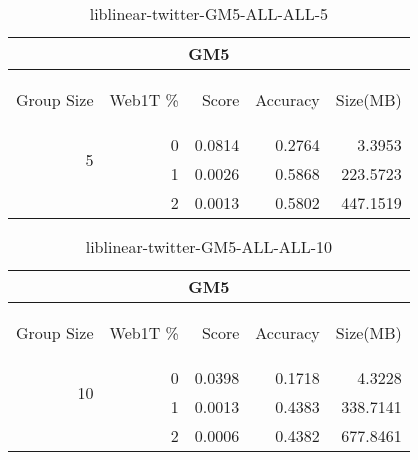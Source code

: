 \begin{center}
\begin{table}[htbp] 
 \begin{center}
\begin{tabular}{ | r | r | r | r | r |}
\hline
\multicolumn{5}{|c|}{GM5}\\
\hline
\begin{sideways}Group Size\end{sideways} & \begin{sideways}Web1T \%\end{sideways} & \begin{sideways}Score\end{sideways} & \begin{sideways}Accuracy\end{sideways} & \begin{sideways}Size(MB)\end{sideways}\\
\hline
\multirow{2}{*}{5}
 & 0 & 0.0814 & 0.2764 & 3.3953\\ \cline{2-5}
 & 1 & 0.0026 & 0.5868 & 223.5723\\ \cline{2-5}
 & 2 & 0.0013 & 0.5802 & 447.1519\\ \cline{2-5}
\hline
\end{tabular}
\caption{liblinear-twitter-GM5-ALL-ALL-5}
\label{table:liblinear-twitter-GM5-ALL-ALL-5}
\end{center}
 \end{table}
\end{center}

\begin{center}
\begin{table}[htbp] 
 \begin{center}
\begin{tabular}{ | r | r | r | r | r |}
\hline
\multicolumn{5}{|c|}{GM5}\\
\hline
\begin{sideways}Group Size\end{sideways} & \begin{sideways}Web1T \%\end{sideways} & \begin{sideways}Score\end{sideways} & \begin{sideways}Accuracy\end{sideways} & \begin{sideways}Size(MB)\end{sideways}\\
\hline
\multirow{2}{*}{10}
 & 0 & 0.0398 & 0.1718 & 4.3228\\ \cline{2-5}
 & 1 & 0.0013 & 0.4383 & 338.7141\\ \cline{2-5}
 & 2 & 0.0006 & 0.4382 & 677.8461\\ \cline{2-5}
\hline
\end{tabular}
\caption{liblinear-twitter-GM5-ALL-ALL-10}
\label{table:liblinear-twitter-GM5-ALL-ALL-10}
\end{center}
 \end{table}
\end{center}

